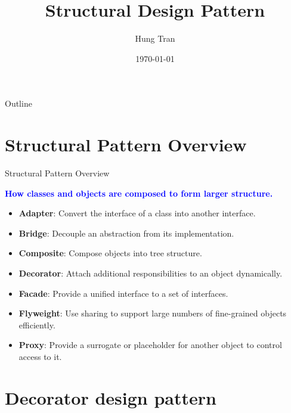 \documentclass[13pt]{beamer}
\title[Design Pattern]{Structural Design Pattern}
\author{Hung Tran}
\institute{Fpt software}
\date{\today}
\begin{document}
\begin{frame}
	\titlepage
\end{frame}

\begin{frame}{Outline}
	\tableofcontents
\end{frame}

\section{Structural Pattern Overview}

\begin{frame}{Structural Pattern Overview}
	\begin{center}
		\textcolor{blue}{\textbf{How classes and objects are composed to form larger structure.}}
	\end{center}
	\begin{itemize}
		\item \textbf{Adapter}: Convert the interface of a class into another interface.
		\item \textbf{Bridge}: Decouple an abstraction from its implementation.
		\item \textbf{Composite}: Compose objects into tree structure.
		\item \textbf{Decorator}: Attach additional responsibilities to an object dynamically.
		\item \textbf{Facade}: Provide a unified interface to a set of interfaces.
		\item \textbf{Flyweight}: Use sharing to support large numbers of fine-grained objects efficiently.
		\item \textbf{Proxy}: Provide a surrogate or placeholder for another object to control access to it.
	\end{itemize}
\end{frame}

\section{Decorator design pattern}
\end{document}
